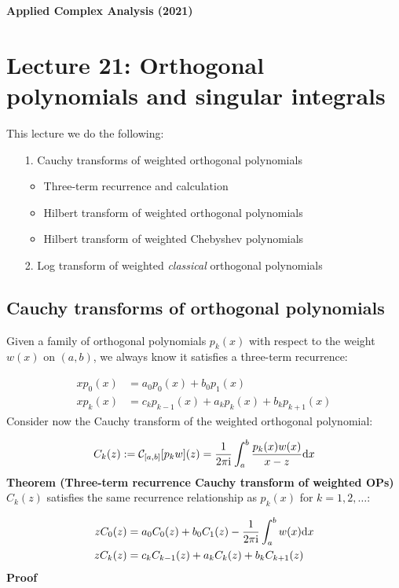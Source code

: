 \documentclass[12pt,landscape]{article}
\def\D{ {\rm d} }
\def\I{ {\rm i} }
\def\dx{\D x}
\begin{document}
{\LARGE
\sf
\textbf{Applied Complex Analysis (2021)}

\section{Lecture 21: Orthogonal polynomials and singular integrals}
This lecture we do the following:

\begin{itemize}
\item[1. ] Cauchy transforms of weighted orthogonal polynomials

\begin{itemize}
\item Three-term recurrence and calculation


\item Hilbert transform of weighted orthogonal polynomials


\item Hilbert transform of weighted Chebyshev polynomials

\end{itemize}

\item[2. ] Log transform of weighted \emph{classical} orthogonal polynomials

\end{itemize}
\newpage
\subsection{Cauchy transforms of orthogonal polynomials}
Given a family of orthogonal polynomials $p_k(x)$ with respect to the weight $w(x)$ on $(a,b)$, we always know it satisfies a three-term recurrence:


\begin{align*}
x p_0(x) &= a_0 p_0(x) + b_0 p_1(x) \\
x p_k(x) &= c_k p_{k-1}(x) + a_k p_k(x) + b_k p_{k+1}(x)
\end{align*}
Consider now the Cauchy transform of the weighted orthogonal polynomial:

\[
C_k(z) := {\cal C}_{[a,b]}[p_k w](z) = {1 \over 2 \pi \I} \int_a^b {p_k(x) w(x) \over x -z} \dx
\]
\textbf{Theorem (Three-term recurrence Cauchy transform of weighted OPs)} $C_k(z)$ satisfies the same recurrence relationship as $p_k(x)$ for $k=1,2,\ldots$:


\begin{align*}
z C_0(z) &= a_0 C_0(z) + b_0 C_1(z) - {1 \over 2 \pi \I} \int_a^b w(x) \dx \\
z C_k(z) &= c_k C_{k-1}(z) + a_k C_k(z) + b_k C_{k+1}(z)
\end{align*}
\newpage
\textbf{Proof}


}
\end{document}
